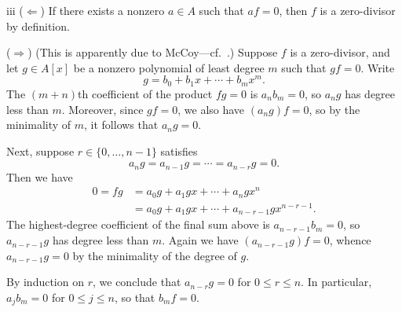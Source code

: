 \begin{partsolution}{iii}
(\(\Leftarrow\))
If there exists a nonzero \(a \in A\) such that \(a f = 0\), then \(f\) is a zero-divisor by definition.

(\(\Rightarrow\))
(This is apparently due to McCoy---cf.~\cite[Theorem 2]{McCoyDivisorsOfZero}.)
Suppose \(f\) is a zero-divisor, and let \(g \in A[x]\) be a nonzero polynomial of least degree \(m\) such that \(g f = 0\).
Write
\begin{equation*}
g = b_0 + b_1 x + \cdots + b_m x^m.
\end{equation*}
The \((m+n)\)th coefficient of the product \(f g = 0\) is \(a_n b_m = 0\), so \(a_n g\) has degree less than \(m\).
Moreover, since \(g f = 0\), we also have \((a_n g) f = 0\), so by the minimality of \(m\), it follows that \(a_n g = 0\).

Next, suppose \(r\in\{0,\ldots,n-1\}\) satisfies
\begin{equation*}
a_n g
= a_{n-1} g
= \cdots
= a_{n-r} g
= 0.
\end{equation*}
Then we have
\begin{align*}
0
= f g
&= a_0 g + a_1 g x + \cdots + a_n g x^n
\\&= a_0 g + a_1 g x + \cdots + a_{n-r-1} g x^{n-r-1}.
\end{align*}
The highest-degree coefficient of the final sum above is \(a_{n-r-1} b_m = 0\), so \(a_{n-r-1} g\) has degree less than \(m\).
Again we have \((a_{n-r-1} g) f = 0\), whence \(a_{n-r-1} g = 0\) by the minimality of the degree of \(g\).

By induction on \(r\), we conclude that \(a_{n-r} g = 0\) for \(0 \leq r \leq n\).
In particular, \(a_j b_m = 0\) for \(0\leq j \leq n\), so that \(b_m f = 0\).
\end{partsolution}

